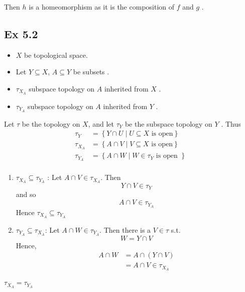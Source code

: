 \documentclass{article}
\theoremstyle{remark}
\begin{document}
Then $h$  is a homeomorphism as it is the composition of $f$  and $g$ .


\subsection*{Ex 5.2}%
\label{ssub:5_3}

\begin{itemize}
    \item $X$  be topological space.
    \item Let $Y \subseteq X$,    $A \subseteq Y$  be subsets .
    \item
 $\tau _{X_{A}} $  subspace topology on $A$  inherited from $X$ .
\item  $\tau _{Y_{A}}$ subspace topology on $A$  inherited from $Y$ .
\end{itemize}

Let $\tau $  be the topology on $X$, and let $\tau _{Y}$  be the subspace topology on $Y$ . Thus \[
\begin{split}
   \tau_{Y} &=  \left\{ Y \cap U  \mid U \subseteq X \text{ is open}   \right\}\\
   \tau _{X_{A}} &=  \left\{ A \cap V  \mid V \subseteq X \text{ is open} \right\} \\
   \tau _{Y_{A}}  &  = \left\{ A \cap W  \mid W \in \tau _{Y} \text{ is open }\right\} \\
\end{split}
\]

\begin{enumerate}[label=(\roman*)]
    \item $\tau _{X_{A}} \subseteq  \tau _{Y_{A}}$ : Let $A\cap V \in \tau _{X_{A}} $. Then \[
    Y \cap V \in \tau _{Y}
    \]
    and so \[
    A \cap V \in \tau _{Y_{A}}
    \]
    Hence  $\tau _{X_{A}} \subseteq  \tau _{Y_{A}}$

\item $\tau _{Y_{A}}  \subseteq  \tau_{X_{A}}  $: Let $A \cap W \in \tau _{Y_{A}}$. Then there is a $V \in \tau $ s.t.
   \[
   W = Y \cap V
   \]
   Hence, \[
       \begin{split}
       A \cap  W &= A \cap \left( Y \cap V \right) \\
       &= A \cap V \in \tau _{X_{A}} \\
       \end{split}
   \]
\end{enumerate}

$\tau _{X_{A}} = \tau _{Y_{A}}$
\end{document}
